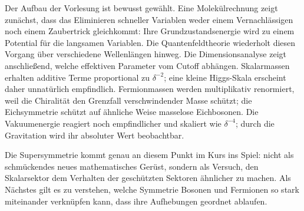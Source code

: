 Der Aufbau der Vorlesung ist bewusst gewählt. Eine Molekülrechnung zeigt zunächst, dass das Eliminieren schneller Variablen weder einem Vernachlässigen noch einem Zaubertrick gleichkommt: Ihre Grundzustandsenergie wird zu einem Potential für die langsamen Variablen. Die Quantenfeldtheorie wiederholt diesen Vorgang über verschiedene Wellenlängen hinweg. Die Dimensionsanalyse zeigt anschließend, welche effektiven Parameter vom Cutoff abhängen. Skalarmassen erhalten additive Terme proportional zu \(\delta^{-2}\); eine kleine Higgs-Skala erscheint daher unnatürlich empfindlich. Fermionmassen werden multiplikativ renormiert, weil die Chiralität den Grenzfall verschwindender Masse schützt; die Eichsymmetrie schützt auf ähnliche Weise masselose Eichbosonen. Die Vakuumenergie reagiert noch empfindlicher und skaliert wie \(\delta^{-4}\); durch die Gravitation wird ihr absoluter Wert beobachtbar.

Die Supersymmetrie kommt genau an diesem Punkt im Kurs ins Spiel: nicht als schmückendes neues mathematisches Gerüst, sondern als Versuch, den Skalarsektor dem Verhalten der geschützten Sektoren ähnlicher zu machen. Als Nächstes gilt es zu verstehen, welche Symmetrie Bosonen und Fermionen so stark miteinander verknüpfen kann, dass ihre Aufhebungen geordnet ablaufen.